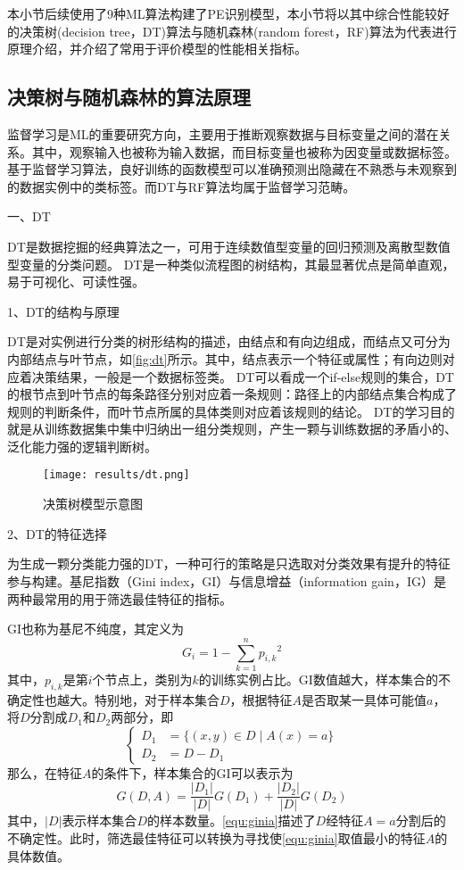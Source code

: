 本小节后续使用了9种ML算法构建了PE识别模型，本小节将以其中综合性能较好的决策树(decision tree，DT)算法与随机森林(random forest，RF)算法为代表进行原理介绍，并介绍了常用于评价模型的性能相关指标。

\subsection{决策树与随机森林的算法原理}
监督学习是ML的重要研究方向，主要用于推断观察数据与目标变量之间的潜在关系。其中，观察输入也被称为输入数据，而目标变量也被称为因变量或数据标签。
基于监督学习算法，良好训练的函数模型可以准确预测出隐藏在不熟悉与未观察到的数据实例中的类标签。而DT与RF算法均属于监督学习范畴。

一、DT

DT是数据挖掘的经典算法之一，可用于连续数值型变量的回归预测及离散型数值型变量的分类问题\cite{Li2017,Liu2018}。
DT是一种类似流程图的树结构，其最显著优点是简单直观，易于可视化、可读性强。

1、DT的结构与原理

DT是对实例进行分类的树形结构的描述，由结点和有向边组成，而结点又可分为内部结点与叶节点，如\autoref{fig:dt}所示。其中，结点表示一个特征或属性；有向边则对应着决策结果，一般是一个数据标签类\cite{Li2017,Zhou2016}。
DT可以看成一个if-else规则的集合，DT的根节点到叶节点的每条路径分别对应着一条规则：路径上的内部结点集合构成了规则的判断条件，而叶节点所属的具体类则对应着该规则的结论。
DT的学习目的就是从训练数据集中集中归纳出一组分类规则，产生一颗与训练数据的矛盾小的、泛化能力强的逻辑判断树。
\begin{figure}[htbp]
      \centering
      \texttt{[image: results/dt.png]}
      \caption{\label{fig:dt}决策树模型示意图}
\end{figure}

2、DT的特征选择

为生成一颗分类能力强的DT，一种可行的策略是只选取对分类效果有提升的特征参与构建。基尼指数（Gini index，GI）与信息增益（information gain，IG）是两种最常用的用于筛选最佳特征的指标。

GI也称为基尼不纯度，其定义为
\begin{equation}
      \label{equ:gini}
      G_i = 1 - \sum_{k=1}^n{p_{i,k}}^2
\end{equation}
其中，$p_{i,k}$是第$i$个节点上，类别为$k$的训练实例占比。GI数值越大，样本集合的不确定性也越大。特别地，对于样本集合$D$，根据特征$A$是否取某一具体可能值$a$，将$D$分割成$D_1$和$D_2$两部分，即
\begin{equation}
      \label{equ:daset}
      \left \{
      \begin{aligned}
            D_1 &= \{ (x,y) \in D \mid A(x) = a\} \\
            D_2 &= D - D_1
      \end{aligned}
      \right.
      \end{equation}
那么，在特征$A$的条件下，样本集合的GI可以表示为
\begin{equation}
      \label{equ:ginia}
      G(D,A) = \frac{|D_1|}{|D|}G(D_1) + \frac{|D_2|}{|D|}G(D_2)
\end{equation}
其中，$|D|$表示样本集合$D$的样本数量。\autoref{equ:ginia}描述了$D$经特征$A=a$分割后的不确定性。此时，筛选最佳特征可以转换为寻找使\autoref{equ:ginia}取值最小的特征$A$的具体数值。

